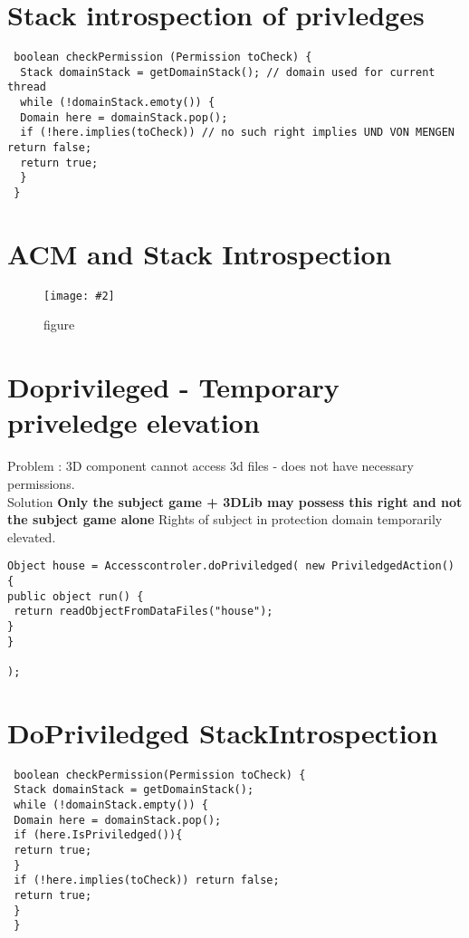 \documentclass[a4paper,10pt]{scrreprt}
\newcommand{\pic}[2][figure]{\begin{figure}[h]
 \centering
 \texttt{[image: \#2]}
 \caption{#1}
\end{figure}
}
\begin{document}
\section{Stack introspection of privledges}
\begin{lstlisting}
 boolean checkPermission (Permission toCheck) {
  Stack domainStack = getDomainStack(); // domain used for current thread
  while (!domainStack.emoty()) {
  Domain here = domainStack.pop();
  if (!here.implies(toCheck)) // no such right implies UND VON MENGEN	return false;
  return true;
  }
 }
\end{lstlisting}

\section{ACM and Stack Introspection}
\pic{inacm.png}

\section{Doprivileged - Temporary priveledge elevation}
Problem : 3D component cannot access 3d files - does not have necessary permissions. \\
Solution \textbf{Only the subject  game + 3DLib may possess this right and not the subject game alone}
Rights of subject in protection domain temporarily elevated.

\begin{lstlisting}[caption=Syntax of dopriviledged]
Object house = Accesscontroler.doPriviledged( new PriviledgedAction() {
public object run() {
 return readObjectFromDataFiles("house");
}
}

); 
\end{lstlisting}

\section{DoPriviledged StackIntrospection}
\begin{lstlisting}
 boolean checkPermission(Permission toCheck) {
 Stack domainStack = getDomainStack();
 while (!domainStack.empty()) {
 Domain here = domainStack.pop();
 if (here.IsPriviledged()){
 return true;
 }
 if (!here.implies(toCheck)) return false;
 return true;
 }
 }
\end{lstlisting}
\end{document}
